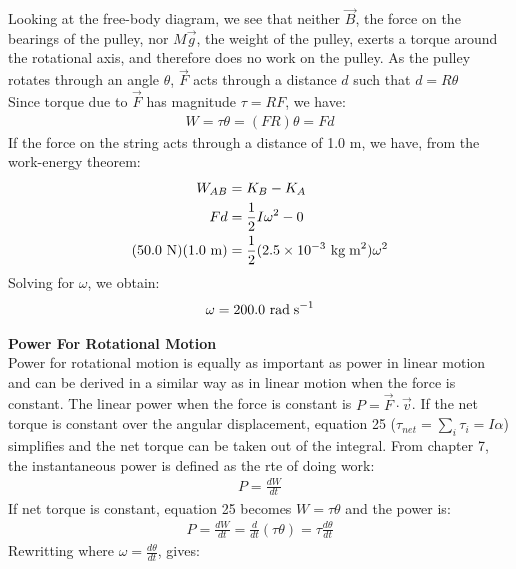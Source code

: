 \documentclass[a4paper]{article}
\let\bf\textbf
\newcommand\der[2]{\frac{d #1}{d #2}}
\newcommand\rads{\text{ rad\;s}^{-1}}
\newcommand\m{\text{ m}}
\newcommand\kgmm{\text{ kg\;m}^{2}}
\begin{document}
\begin{shaded}
\begin{center}
    \end{center}
    Looking at the free-body diagram, we see that neither $\vec{B}$, the force on the bearings of the pulley, nor $M\vec{g}$, the weight of the pulley, exerts a torque around the rotational axis, and therefore does no work on the pulley. As the pulley rotates through an angle $\theta$, $\vec{F}$ acts through a distance $d$ such that $d = R\theta$
    \vspace{1mm}\\
    Since torque due to $\vec{F}$ has magnitude $\tau = RF$, we have:
    \begin{align*}
        W = \tau\theta = (FR)\theta = Fd
    \end{align*}
    If the force on the string acts through a distance of 1.0 m, we have, from the work-energy theorem:
    \begin{align*}
        W_{AB} &= K_B - K_A\\
        Fd &= \frac{1}{2}I\omega^2 - 0\\
        (50.0\text{ N})(1.0\m) &= \frac{1}{2}(2.5\times10^{-3}\kgmm)\omega^2
    \end{align*}
    Solving for $\omega$, we obtain:
    \begin{align*}
        \omega = 200.0\rads
    \end{align*}
\end{shaded}
\newpage\noindent
\bf{Power For Rotational Motion}
\vspace{2mm}\\
Power for rotational motion is equally as important as power in linear motion and can be derived in a similar way as in linear motion when the force is constant. The linear power when the force is constant is $P = \vec{F}\cdot\vec{v}$. If the net torque is constant over the angular displacement, equation 25 ($\tau_{net} = \sum_i\tau_i = I\alpha$) simplifies and the net torque can be taken out of the integral. From chapter 7, the instantaneous power is defined as the rte of doing work:
\begin{align*}
    P = \der{W}{t}
\end{align*}
If net torque is constant, equation 25 becomes $W = \tau\theta$ and the power is:
\begin{align*}
    P = \der{W}{t} = \der{}{t}(\tau\theta) = \tau\der{\theta}{t}
\end{align*}
Rewritting where $\displaystyle \omega = \der{\theta}{t}$, gives:
\end{document}
